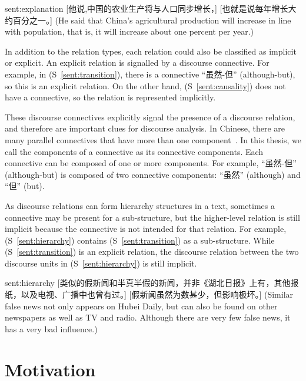 \begin{sent}{sent:explanation}{}
    [他说,中国的农业生产将与人口同步增长，] [也就是说每年增长大约百分之一。]
    (He said that China's agricultural production will increase in line with
    population, that is, it will increase about one percent per year.)
\end{sent}

In addition to the relation types, each relation could also be classified
as implicit or explicit. An explicit relation is signalled by a discourse connective.
For example, in (S~\ref{sent:transition}), there is a connective ``虽然-但''
(although-but), so this is an explicit relation. On the other hand,
(S~\ref{sent:causality}) does not have a connective, so the relation
is represented implicitly.

These discourse connectives explicitly signal the presence of a discourse relation,
and therefore are important clues for discourse analysis.
In Chinese, there are many parallel connectives that have more than one
component~\citep{zhou2012pdtb}.
In this thesis, we call the components of a connective as its connective components.
Each connective can be composed of one or more components. For example, ``虽然-但''
(although-but) is composed of two connective components: ``虽然'' (although)
and ``但'' (but).

As discourse relations can form hierarchy structures in a text, sometimes
a connective may be present for a sub-structure, but the higher-level relation
is still implicit because the connective is not intended for that relation.
For example, (S~\ref{sent:hierarchy}) contains (S~\ref{sent:transition})
as a sub-structure. While (S~\ref{sent:transition}) is an explicit relation,
the discourse relation between the two discourse units in (S~\ref{sent:hierarchy})
is still implicit.

\begin{sent}{sent:hierarchy}{}
    [类似的假新闻和半真半假的新闻，并非《湖北日报》上有，其他报纸，以及电视、广播中也曾有过。]
    [假新闻虽然为数甚少，但影响极坏。]
    (Similar false news not only appears on Hubei Daily, but can also be found on
    other newspapers as well as TV and radio.
    Although there are very few false news, it has a very bad influence.)
\end{sent}



%
%
\section{Motivation}

